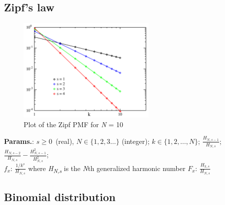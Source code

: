     
        
\subsection{Zipf's law}


    \begin{figure}[H]
        \centering
        \includegraphics[width=0.6\textwidth]{images/Zipf distribution PMF.png}
        \caption{Plot of the Zipf PMF for \textit{N} = 10}
    \end{figure}




    {\color{darkblue} \textbf{Params.}:} {$s \geq 0\,$ (real),  $N \in \{1,2,3\ldots\}$ (integer)}; {$k \in \{1,2,\ldots,N\}$}; {$\frac{H_{N,s-1}}{H_{N,s}}$}; {$\frac{H_{N,s-2}}{H_{N,s}}-\frac{H^2_{N,s-1}}{H^2_{N,s}}$};\hspace{0.5cm}\\{\color{darkblue} \textbf{$f_x$}:} {$\frac{1/k^s}{H_{N,s}}$ where \textit{H\textsubscript{N,s}} is the \textit{N}th generalized harmonic number}{\color{darkblue} \textbf{$F_x$}:} {$\frac{H_{k,s}}{H_{N,s}}$}



    
        
\subsection{Binomial distribution}


